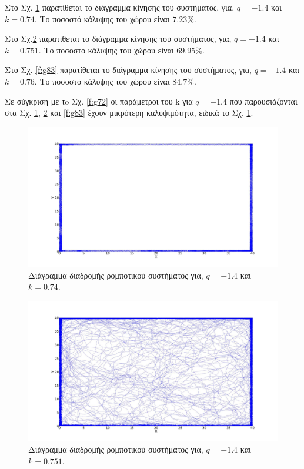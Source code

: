 Στο Σχ. \ref{f:g81} παρατίθεται το διάγραμμα κίνησης του συστήματος, για, $q = -1.4$ και $k = 0.74$.
Το ποσοστό κάλυψης του χώρου είναι  $7.23\%$. 

Στο Σχ.\ref{f:g82} παρατίθεται το διάγραμμα κίνησης του συστήματος, για, $q = -1.4$ και $k = 0.751$.
Το ποσοστό κάλυψης του χώρου είναι  $69.95 \%$.

Στο Σχ. \ref{f:g83} παρατίθεται το διάγραμμα κίνησης του συστήματος, για, $q = -1.4$ και $k = 0.76$.
Το ποσοστό κάλυψης του χώρου είναι  $84.7\%$.

Σε σύγκριση με τo Σχ. \ref{f:g72}  οι παράμετροι του k για $q = -1.4$ που παρουσιάζονται στα Σχ. \ref{f:g81}, \ref{f:g82} και \ref{f:g83} έχουν μικρότερη καλυψιμότητα, ειδικά το Σχ. \ref{f:g81}.

\begin{figure}[ht]
	\centering
	\includegraphics[width=1\linewidth]{LateX images/log/k/g1-1.4}
	\caption{Διάγραμμα διαδρομής ρομποτικού συστήματος για, $q = -1.4$ και $k = 0.74$.}
	\label{f:g81}	
\end{figure}

\begin{figure}[ht]
	\centering
	\includegraphics[width=1\linewidth]{LateX images/log/k/g2-1.4}
	\caption{Διάγραμμα διαδρομής ρομποτικού συστήματος για, $q = -1.4$ και $k = 0.751$.}
	\label{f:g82}	
\end{figure}

